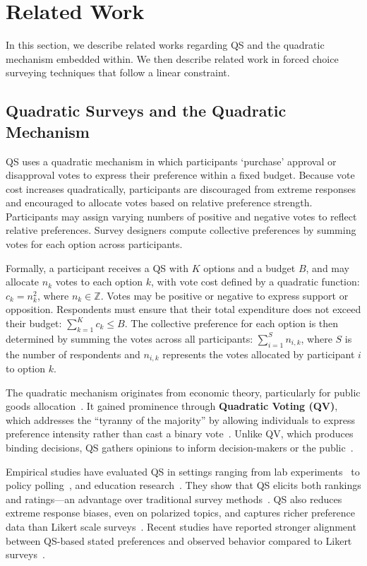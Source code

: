 \section{Related Work}
\label{sec:relatedWorks}
In this section, we describe related works regarding QS and the quadratic mechanism embedded within. We then describe related work in forced choice surveying techniques that follow a linear constraint.

\subsection{Quadratic Surveys and the Quadratic Mechanism}
QS uses a quadratic mechanism in which participants `purchase' approval or disapproval votes to express their preference within a fixed budget. Because vote cost increases quadratically, participants are discouraged from extreme responses and encouraged to allocate votes based on relative preference strength. Participants may assign varying numbers of positive and negative votes to reflect relative preferences. Survey designers compute collective preferences by summing votes for each option across participants.

Formally, a participant receives a QS with $K$ options and a budget $B$, and may allocate $n_k$ votes to each option $k$, with vote cost defined by a quadratic function: $c_k = n_k^2$, where $n_k \in \mathbb{Z}$. Votes may be positive or negative to express support or opposition. Respondents must ensure that their total expenditure does not exceed their budget: $\sum_{k=1}^{K} c_k \leq B$. The collective preference for each option is then determined by summing the votes across all participants: $\sum_{i=1}^{S} n_{i,k}$, where $S$ is the number of respondents and $n_{i,k}$ represents the votes allocated by participant $i$ to option $k$.

The quadratic mechanism originates from economic theory, particularly for public goods allocation~\cite{grovesOptimalAllocationPublic1977}. It gained prominence through \textbf{Quadratic Voting (QV)}, which addresses the ``tyranny of the majority'' by allowing individuals to express preference intensity rather than cast a binary vote~\cite{posner2018radical}. Unlike QV, which produces binding decisions, QS gathers opinions to inform decision-makers or the public~\cite{cavaille2024cares}. %

Empirical studies have evaluated QS in settings ranging from lab experiments~\cite{chengCanShowWhat2021,quarfoot2017quadratic} to policy polling~\cite{cavaille2024cares, hollandDistributiveImpactsSupport2022}, and education research~\cite{naylor2017first}. They show that QS elicits both rankings and ratings---an advantage over traditional survey methods~\cite{chengCanShowWhat2021}. QS also reduces  extreme response biases, even on polarized topics, and captures richer preference data than Likert scale surveys~\cite{quarfoot2017quadratic, cavaille2024cares, chengCanShowWhat2021, naylor2017first}. Recent studies have reported stronger alignment between QS-based stated preferences and observed behavior compared to Likert surveys~\cite{cavaille2024cares, chengCanShowWhat2021}.

